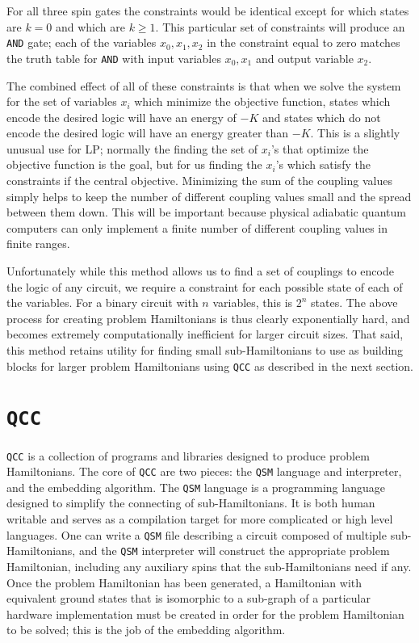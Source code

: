 For all three spin gates the constraints would be identical except for which states are $k = 0$ and which are $k \ge 1$.  This particular set of constraints will produce an \texttt{AND} gate; each of the variables $x_0, x_1, x_2$ in the constraint equal to zero matches the truth table for \texttt{AND} with input variables $x_0, x_1$ and output variable $x_2$.

The combined effect of all of these constraints is that when we solve the system for the set of variables $x_i$ which minimize the objective function, states which encode the desired logic will have an energy of $-K$ and states which do not encode the desired logic will have an energy greater than $-K$.
This is a slightly unusual use for LP; normally the finding the set of $x_i$'s that optimize the objective function is the goal, but for us finding the $x_i$'s which satisfy the constraints if the central objective.
Minimizing the sum of the coupling values simply helps to keep the number of different coupling values small and the spread between them down.  This will be important because physical adiabatic quantum computers can only implement a finite number of different coupling values in finite ranges. 

Unfortunately while this method allows us to find a set of couplings to encode the logic of any circuit, we require a constraint for each possible state of each of the variables.  For a binary circuit with $n$ variables, this is $2^n$ states.
The above process for creating problem Hamiltonians is thus clearly exponentially hard, and becomes extremely computationally inefficient for larger circuit sizes.
That said, this method retains utility for finding small sub-Hamiltonians to use as building blocks for larger problem Hamiltonians using \texttt{QCC} as described in the next section.

\section{\texttt{QCC}}
\texttt{QCC} is a collection of programs and libraries designed to produce problem Hamiltonians.  The core of \texttt{QCC} are two pieces: the \texttt{QSM} language and interpreter, and the embedding algorithm.  The \texttt{QSM} language is a programming language designed to simplify the connecting of sub-Hamiltonians.  It is both human writable and serves as a compilation target for more complicated or high level languages.  One can write a \texttt{QSM} file describing a circuit composed of multiple sub-Hamiltonians, and the \texttt{QSM} interpreter will construct the appropriate problem Hamiltonian, including any auxiliary spins that the sub-Hamiltonians need if any.  Once the problem Hamiltonian has been generated, a Hamiltonian with equivalent ground states that is isomorphic to a sub-graph of a particular hardware implementation must be created in order for the problem Hamiltonian to be solved; this is the job of the embedding algorithm.

